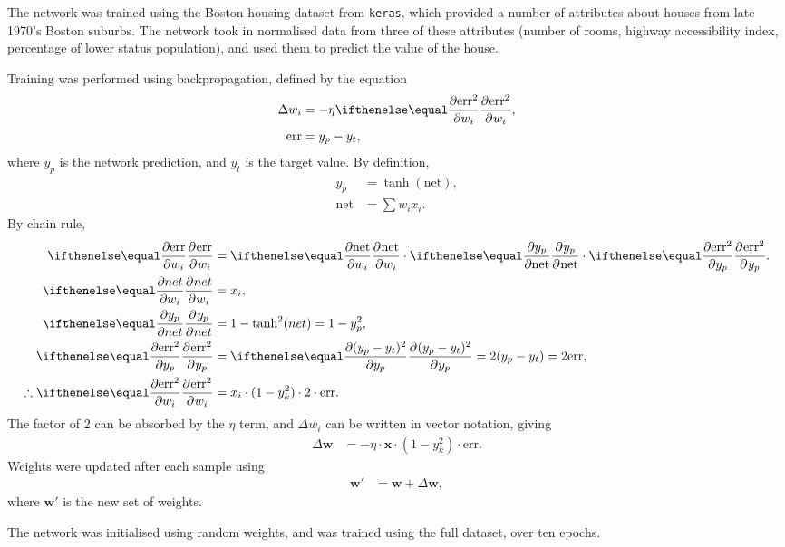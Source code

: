 The network was trained using the Boston housing dataset from \texttt{keras},
which provided a number of attributes about houses from late 1970's Boston
suburbs.
The network took in normalised data from three of these attributes (number of
rooms, highway accessibility index, percentage of lower status population), and
used them to predict the value of the house.

Training was performed using backpropagation, defined by the equation
\begin{align*}
    \Delta w_i &= -\eta\Rpdiff{\text{err}^2}{w_i},\\
    \text{err} &= y_p - y_t,
\end{align*}
where $y_p$ is the network prediction, and $y_t$ is the target value.
By definition,
\begin{align*}
    y_p &= \tanh(\text{net}),\\
    \text{net} &= \sum w_ix_i.
\end{align*}
By chain rule,
\begin{align*}
    \Rpdiff{\text{err}}{w_i} &=
    \Rpdiff{\text{net}}{w_i} \cdot
    \Rpdiff{y_p}{\text{net}} \cdot
    \Rpdiff{\text{err}^2}{y_p}.\\
    \Rpdiff{net}{w_i} &= x_i,\\
    \Rpdiff{y_p}{net} &= 1 - \tanh^2(net) = 1 - y_p^2,\\
    \Rpdiff{\text{err}^2}{y_p} &= \Rpdiff{(y_p - y_t)^2}{y_p}
    = 2(y_p - y_t) = 2\text{err},\\
    \therefore\Rpdiff{\text{err}^2}{w_i} &=
    x_i \cdot (1 - y_k^2) \cdot 2\cdot\text{err}.
\end{align*}
The factor of 2 can be absorbed by the $\eta$ term, and $\Delta w_i$ can be
written in vector notation, giving
\begin{align*}
    \Delta \mathbf{w} &= -\eta\cdot\mathbf{x}\cdot (1-y_k^2)\cdot \text{err}.
\end{align*}
Weights were updated after each sample using
\begin{align*}
    \mathbf{w}' &= \mathbf{w} + \Delta\mathbf{w},
\end{align*}
where $\mathbf{w}'$ is the new set of weights.

The network was initialised using random weights, and was trained using the full
dataset, over ten epochs.


